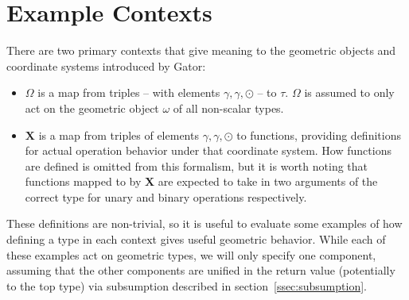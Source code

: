 \documentclass{article}
\newcommand{\Chi}{\mathbf{X}}
\begin{document}
\section{Example Contexts}
There are two primary contexts that give meaning to the geometric objects and coordinate systems introduced by Gator:
\begin{itemize}
	\item $\Omega$ is a map from triples -- with elements $\gamma,\gamma,\odot$ -- to $\tau$.  $\Omega$ is assumed to only act on the geometric object $\omega$ of all non-scalar types.
	
	\item $\Chi$ is a map from triples of elements $\gamma, \gamma,\odot$ to functions, providing definitions for actual operation behavior under that coordinate system.
	How functions are defined is omitted from this formalism, but it is worth noting that functions mapped to by $\Chi$ are expected to take in two arguments of the correct type for unary and binary operations respectively.
\end{itemize}
These definitions are non-trivial, so it is useful to evaluate some examples of how defining a type in each context gives useful geometric behavior.  While each of these examples act on geometric types, we will only specify one component, assuming that the other components are unified in the return value (potentially to the top type) via subsumption described in section~\ref{ssec:subsumption}.
\end{document}

